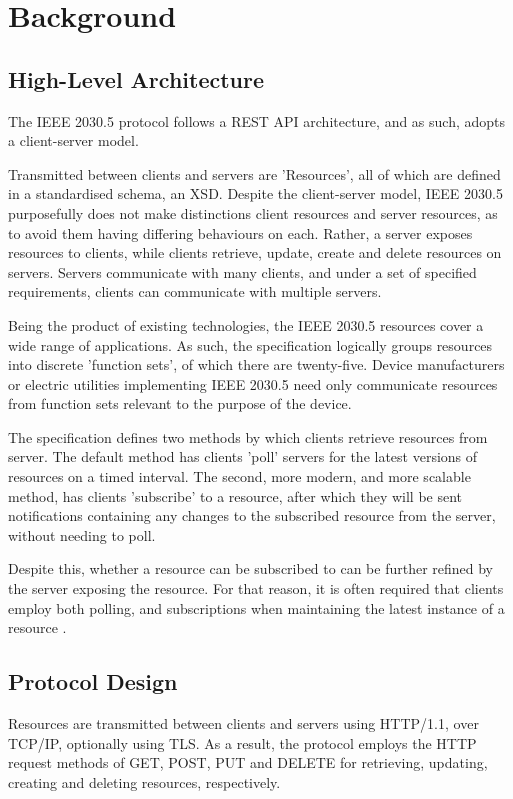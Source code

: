 \chapter{Background}\label{ch:background}

\section{High-Level Architecture}
The IEEE 2030.5 protocol follows a REST API architecture, and as such, adopts a client-server model.

Transmitted between clients and servers are 'Resources', all of which are defined in a standardised schema, an XSD. 
Despite the client-server model, IEEE 2030.5 purposefully does not make distinctions client resources and server resources, as to avoid them having differing behaviours on each. Rather, a server exposes resources to clients, while clients retrieve, update, create and delete resources on servers.
Servers communicate with many clients, and under a set of specified requirements, clients can communicate with multiple servers.

Being the product of existing technologies, the IEEE 2030.5 resources cover a wide range of applications. As such, the specification logically groups resources into discrete 'function sets', of which there are twenty-five. 
Device manufacturers or electric utilities implementing IEEE 2030.5 need only communicate resources from function sets relevant to the purpose of the device. 

The specification defines two methods by which clients retrieve resources from server. The default method has clients 'poll' servers for the latest versions of resources on a timed interval.
The second, more modern, and more scalable method, has clients 'subscribe' to a resource, after which they will be sent notifications containing any changes to the subscribed resource from the server, without needing to poll.

Despite this, whether a resource can be subscribed to can be further refined by the server exposing the resource.
For that reason, it is often required that clients employ both polling, and subscriptions when maintaining the latest instance of a resource \cite{AUSDOE} \cite{IEEE2030.5}. 

\section{Protocol Design}
Resources are transmitted between clients and servers using HTTP/1.1, over TCP/IP, optionally using TLS.
As a result, the protocol employs the HTTP request methods of GET, POST, PUT and DELETE for retrieving, updating, creating and deleting resources, respectively.

